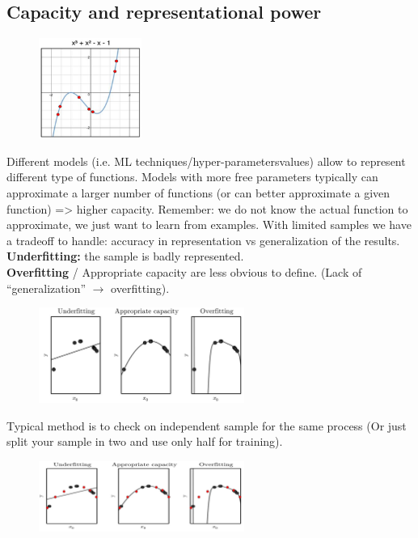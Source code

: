 \subsection{Capacity and representational power}

\begin{figure}
	\includegraphics[width=0.3\textwidth]{figure_ml/capacity.png}
\end{figure} 

Different models (i.e. ML techniques/hyper-parametersvalues) allow to represent different type of functions.
Models with more free parameters typically can approximate a larger number
of functions (or can better approximate a given function) => higher capacity.
Remember: we do not know the actual function to approximate, we just want
to learn from examples.
With limited samples we have a tradeoff to
handle: accuracy in representation vs generalization of the results.\\


\noindent
\textbf{Underfitting:} the sample is badly represented.\\
\textbf{Overfitting} / Appropriate capacity are less obvious to define. (Lack of “generalization” $\rightarrow$ overfitting).

\begin{figure}[ht]
	\centering
	\includegraphics[width=0.6\textwidth]{figure_ml/u_a_o.png}
\end{figure}
\FloatBarrier

Typical method is to check on independent sample for the same process (Or just split your sample in two and use only half for training).

\begin{figure}[ht]
	\centering
	\includegraphics[width=0.6\textwidth]{figure_ml/u_a_o2.png}
\end{figure}
\FloatBarrier

